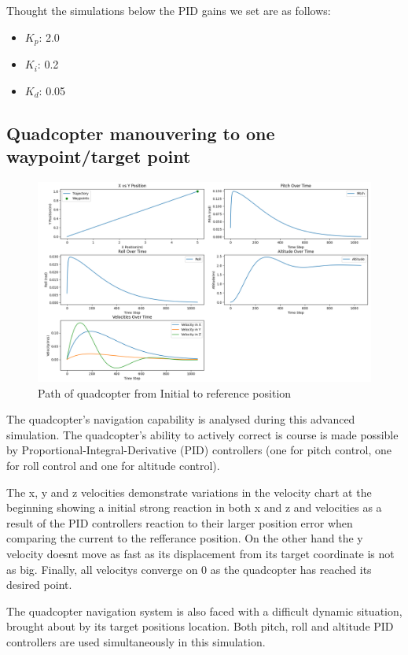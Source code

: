 \documentclass{report}
\begin{document}
Thought the simulations below the PID gains we set are as follows: 

\begin{itemize}
  \item \(K_p\): 2.0
  \item \(K_i\): 0.2
  \item \(K_d\): 0.05
\end{itemize}

\subsection*{Quadcopter manouvering to one waypoint/target point}
\begin{figure}[H]
  \centering
  \includegraphics[width=1\textwidth]{Pictures/Position_control_sim.png} 
  \caption{Path of quadcopter from Initial to reference position}
  \label{fig:Drone_path_one_waypoint}
\end{figure}
The quadcopter’s navigation capability is analysed during this advanced
simulation. The quadcopter’s ability to
actively correct is course is made possible by Proportional-Integral-Derivative
(PID) controllers (one for pitch control, one for roll control and one for altitude control).

The x, y and z velocities demonstrate variations in the velocity
chart at the beginning showing a initial strong reaction in both x and z and velocities as a result of the  PID controllers reaction to their larger position error when comparing the current to the refferance position. On the other hand the y velocity doesnt move as fast as its displacement from its target coordinate is not as big. Finally, all velocitys converge on 0 as the quadcopter has reached its desired point.

The quadcopter navigation system is also faced with a difficult dynamic situation, brought about by its target positions location. Both pitch, roll and altitude PID controllers are used simultaneously in this simulation. 
\end{document}
